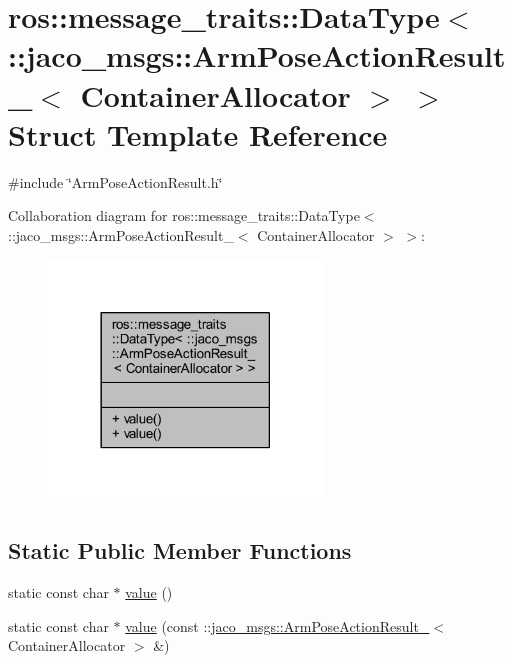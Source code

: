 \hypertarget{structros_1_1message__traits_1_1DataType_3_01_1_1jaco__msgs_1_1ArmPoseActionResult___3_01ContainerAllocator_01_4_01_4}{}\section{ros\+:\+:message\+\_\+traits\+:\+:Data\+Type$<$ \+:\+:jaco\+\_\+msgs\+:\+:Arm\+Pose\+Action\+Result\+\_\+$<$ Container\+Allocator $>$ $>$ Struct Template Reference}
\label{structros_1_1message__traits_1_1DataType_3_01_1_1jaco__msgs_1_1ArmPoseActionResult___3_01ContainerAllocator_01_4_01_4}


{\ttfamily \#include \char`\"{}Arm\+Pose\+Action\+Result.\+h\char`\"{}}



Collaboration diagram for ros\+:\+:message\+\_\+traits\+:\+:Data\+Type$<$ \+:\+:jaco\+\_\+msgs\+:\+:Arm\+Pose\+Action\+Result\+\_\+$<$ Container\+Allocator $>$ $>$\+:
\nopagebreak
\begin{figure}[H]
\begin{center}
\leavevmode
\includegraphics[width=206pt]{d4/ddb/structros_1_1message__traits_1_1DataType_3_01_1_1jaco__msgs_1_1ArmPoseActionResult___3_01Contain5a97817e0787ca331702deb560f2c324}
\end{center}
\end{figure}
\subsection*{Static Public Member Functions}
\begin{DoxyCompactItemize}
\item 
static const char $\ast$ \hyperlink{structros_1_1message__traits_1_1DataType_3_01_1_1jaco__msgs_1_1ArmPoseActionResult___3_01ContainerAllocator_01_4_01_4_ad76e14d4e0cb2f516c143833a7f572d4}{value} ()
\item 
static const char $\ast$ \hyperlink{structros_1_1message__traits_1_1DataType_3_01_1_1jaco__msgs_1_1ArmPoseActionResult___3_01ContainerAllocator_01_4_01_4_a8b20105f79e481e3071d02c97f9f66b1}{value} (const \+::\hyperlink{structjaco__msgs_1_1ArmPoseActionResult__}{jaco\+\_\+msgs\+::\+Arm\+Pose\+Action\+Result\+\_\+}$<$ Container\+Allocator $>$ \&)
\end{DoxyCompactItemize}


